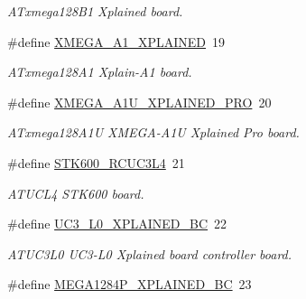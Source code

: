 \begin{DoxyCompactItemize}
\begin{DoxyCompactList}\small\item\em A\-Txmega128\-B1 Xplained board. \end{DoxyCompactList}\item 
\hypertarget{group__group__common__boards_gae79074f51491bf88c25efd857b92cbd4}{\#define \hyperlink{group__group__common__boards_gae79074f51491bf88c25efd857b92cbd4}{X\-M\-E\-G\-A\-\_\-\-A1\-\_\-\-X\-P\-L\-A\-I\-N\-E\-D}~19}\label{group__group__common__boards_gae79074f51491bf88c25efd857b92cbd4}

\begin{DoxyCompactList}\small\item\em A\-Txmega128\-A1 Xplain-\/\-A1 board. \end{DoxyCompactList}\item 
\hypertarget{group__group__common__boards_ga966caec7a287f05d293e525b0ee0ee4d}{\#define \hyperlink{group__group__common__boards_ga966caec7a287f05d293e525b0ee0ee4d}{X\-M\-E\-G\-A\-\_\-\-A1\-U\-\_\-\-X\-P\-L\-A\-I\-N\-E\-D\-\_\-\-P\-R\-O}~20}\label{group__group__common__boards_ga966caec7a287f05d293e525b0ee0ee4d}

\begin{DoxyCompactList}\small\item\em A\-Txmega128\-A1\-U X\-M\-E\-G\-A-\/\-A1\-U Xplained Pro board. \end{DoxyCompactList}\item 
\hypertarget{group__group__common__boards_ga8eec8cd16b9138bb1117e9381138a3fc}{\#define \hyperlink{group__group__common__boards_ga8eec8cd16b9138bb1117e9381138a3fc}{S\-T\-K600\-\_\-\-R\-C\-U\-C3\-L4}~21}\label{group__group__common__boards_ga8eec8cd16b9138bb1117e9381138a3fc}

\begin{DoxyCompactList}\small\item\em A\-T\-U\-C\-L4 S\-T\-K600 board. \end{DoxyCompactList}\item 
\hypertarget{group__group__common__boards_gab872a6d2f79f1bbb274b5f9fff4b855f}{\#define \hyperlink{group__group__common__boards_gab872a6d2f79f1bbb274b5f9fff4b855f}{U\-C3\-\_\-\-L0\-\_\-\-X\-P\-L\-A\-I\-N\-E\-D\-\_\-\-B\-C}~22}\label{group__group__common__boards_gab872a6d2f79f1bbb274b5f9fff4b855f}

\begin{DoxyCompactList}\small\item\em A\-T\-U\-C3\-L0 U\-C3-\/\-L0 Xplained board controller board. \end{DoxyCompactList}\item 
\hypertarget{group__group__common__boards_ga9acdb5a6b5436d3bf40bdfa8c1338152}{\#define \hyperlink{group__group__common__boards_ga9acdb5a6b5436d3bf40bdfa8c1338152}{M\-E\-G\-A1284\-P\-\_\-\-X\-P\-L\-A\-I\-N\-E\-D\-\_\-\-B\-C}~23}\label{group__group__common__boards_ga9acdb5a6b5436d3bf40bdfa8c1338152}


\end{DoxyCompactItemize}
